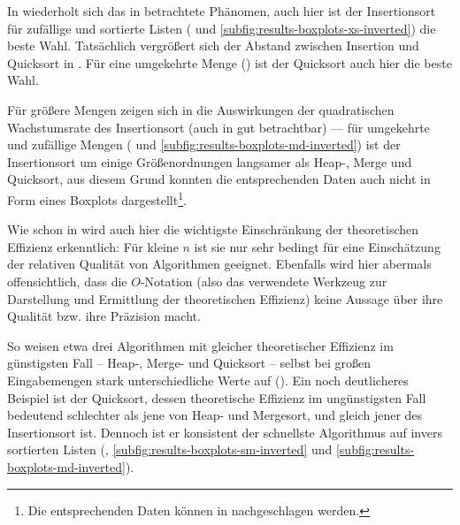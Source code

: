 

In  wiederholt sich das in  betrachtete Phänomen, auch hier ist der Insertionsort für zufällige und sortierte Listen ( und \ref{subfig:results-boxplots-xs-inverted}) die beste Wahl. Tatsächlich vergrößert sich der Abstand zwischen Insertion und Quicksort in . Für eine umgekehrte Menge () ist der Quicksort auch hier die beste Wahl.



Für größere Mengen zeigen sich in  die Auswirkungen der quadratischen Wachstumsrate des Insertionsort (auch in  gut betrachtbar) --- für umgekehrte und zufällige Mengen ( und \ref{subfig:results-boxplots-md-inverted}) ist der Insertionsort um einige Größenordnungen langsamer als Heap-, Merge und Quicksort, aus diesem Grund konnten die entsprechenden Daten auch nicht in Form eines Boxplots dargestellt\footnote{Die entsprechenden Daten können in  nachgeschlagen werden.}.

Wie schon in  wird auch hier die wichtigste Einschränkung der theoretischen Effizienz erkenntlich: Für kleine $n$ ist sie nur sehr bedingt für eine Einschätzung der relativen Qualität von Algorithmen geeignet. Ebenfalls wird hier abermals offensichtlich, dass die $O$-Notation (also das verwendete Werkzeug zur Darstellung und Ermittlung der theoretischen Effizienz) keine Aussage über ihre Qualität bzw. ihre Präzision macht.

So weisen etwa drei Algorithmen mit gleicher theoretischer Effizienz im günstigsten Fall -- Heap-, Merge- und Quicksort -- selbst bei großen Eingabemengen stark unterschiedliche Werte auf (). Ein noch deutlicheres Beispiel ist der Quicksort, dessen theoretische Effizienz im ungünstigsten Fall bedeutend schlechter als jene von Heap- und Mergesort, und gleich jener des Insertionsort ist. Dennoch ist er konsistent der schnellste Algorithmus auf invers sortierten Listen (, \ref{subfig:results-boxplots-sm-inverted} und \ref{subfig:results-boxplots-md-inverted}).

